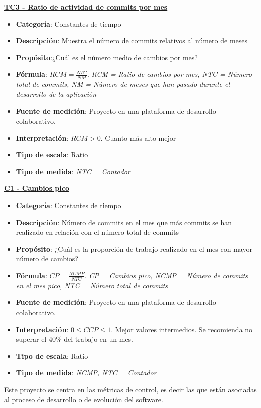 \textbf{\underline{TC3 - Ratio de actividad de commits por mes}}

\begin{itemize}
	\tightlist
	\item \textbf{Categoría}: Constantes de tiempo
	\item \textbf{Descripción}: Muestra el número de commits relativos al número de meses
	\item \textbf{Propósito}:¿Cuál es el número medio de cambios por mes?
	\item \textbf{Fórmula}: $RCM = \frac{NTC}{NM}$. \textit{RCM = Ratio de cambios por mes, NTC = Número total de commits, NM = Número de meses que han pasado durante el desarrollo de la aplicación}
	\item \textbf{Fuente de medición}: Proyecto en una plataforma de desarrollo colaborativo.
	\item \textbf{Interpretación}: $RCM > 0$. Cuanto más alto mejor
	\item \textbf{Tipo de escala}: Ratio
	\item \textbf{Tipo de medida}: \textit{NTC = Contador}
\end{itemize}

\textbf{\underline{C1 - Cambios pico}}

\begin{itemize}
	\tightlist
	\item \textbf{Categoría}: Constantes de tiempo
	\item \textbf{Descripción}: Número de commits en el mes que más commits se han realizado en relación con el número total de commits
	\item \textbf{Propósito}: ¿Cuál es la proporción de trabajo realizado en el mes con mayor número de cambios?
	\item \textbf{Fórmula}: $CP = \frac{NCMP}{NTC}$. \textit{CP = Cambios pico, NCMP = Número de commits en el mes pico, NTC = Número total de commits}
	\item \textbf{Fuente de medición}: Proyecto en una plataforma de desarrollo colaborativo.
	\item \textbf{Interpretación}: $0 \leq CCP \leq 1$. Mejor valores intermedios. Se recomienda no superar el 40\% del trabajo en un mes.
	\item \textbf{Tipo de escala}: Ratio
	\item \textbf{Tipo de medida}: \textit{NCMP, NTC = Contador}
\end{itemize}

Este proyecto se centra en las métricas de control, es decir las que están asociadas al proceso de desarrollo o de evolución del software.

